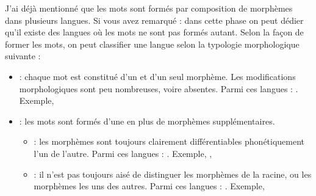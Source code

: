 \documentclass{KodeBook}
\begin{document}
J'ai déjà mentionné que les mots sont formés par composition de morphèmes dans plusieurs langues. 
Si vous avez remarqué : dans cette phase on peut dédier qu'il existe des langues où les mots ne sont pas formés autant. 
Selon la façon de former les mots, on peut classifier une langue selon la typologie morphologique suivante :
\begin{itemize}
	\item {} : chaque mot est constitué d'un et d'un seul morphème. 
	Les modifications morphologiques sont peu nombreuses, voire absentes. 
	Parmi ces langues : . 
	Exemple, 
	
	\item {} : les mots sont formés d'une  en plus de morphèmes supplémentaires.
	\begin{itemize}
		\item {} : les morphèmes sont toujours clairement différentiables phonétiquement l'un de l'autre. 
		Parmi ces langues : . 
		Exemple, , 
		
		\item {} : il n'est pas toujours aisé de distinguer les morphèmes de la racine, ou les morphèmes les uns des autres. 
		Parmi ces langues : .
		Exemple, 
	\end{itemize}
\end{itemize}
\end{document}
